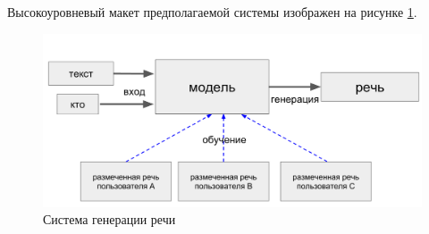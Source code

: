 \documentclass[../diploma.tex]{subfiles}
\begin{document}
Высокоуровневый макет предполагаемой системы изображен на рисунке \ref{fig:speech_system}.

\begin{figure}[h!]
  \includegraphics[scale=0.36]{img/scheme}
  \caption{Система генерации речи}
  \label{fig:speech_system}
\end{figure}

\pagebreak
\end{document}
